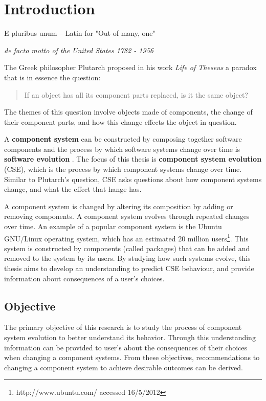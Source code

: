 \chapter{Introduction}
\label{introduction}
\epigraph{E pluribus unum -- Latin for "Out of many, one"}
{\textit{de facto motto of the United States 1782 - 1956}}
The Greek philosopher Plutarch proposed in his work \textit{Life of Theseus} a paradox that is in essence the question:
\begin{quote}
If an object has all its component parts replaced, is it the same object?
\end{quote}
The themes of this question involve objects made of components, the change of their component parts,
and how this change effects the object in question.

A \textbf{component system} can be constructed by composing together software components \citep{Szyperski2002}
and the process by which software systems change over time is \textbf{software evolution} \citep{lehman1980}.
The focus of this thesis is \textbf{component system evolution} (CSE), which is the process by which component systems change over time.
Similar to Plutarch's question, CSE asks questions about how component systems change, and what the effect that hange has.

A component system is changed by altering its composition by adding or removing components.
A component system evolves through repeated changes over time.
An example of a popular component system is the Ubuntu GNU/Linux operating system, which has an estimated 20 million users\footnote{http://www.ubuntu.com/ accessed 16/5/2012}. 
This system is constructed by components (called packages) that can be added and removed to the system by its users.
By studying how such systems evolve, this thesis aims to develop an understanding to predict CSE behaviour,
and provide information about consequences of a user's choices.



\section{Objective}
The primary objective of this research is to study the process of component system evolution to better understand its behavior.
Through this understanding information can be provided to user's about the consequences of their choices when changing a component systems. 
From these objectives, recommendations to changing a component system to achieve desirable outcomes can be derived. 

